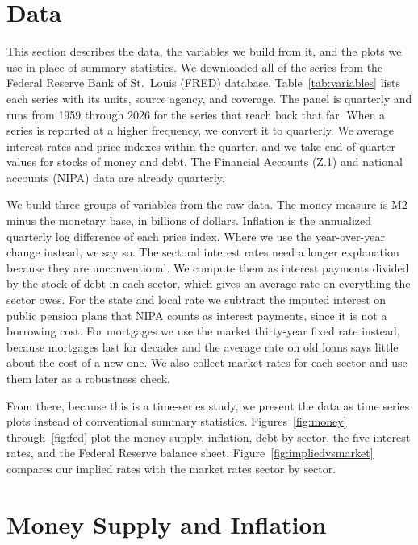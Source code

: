 \section{Data}
\label{sec:data}

This section describes the data, the variables we build from it, and the plots we use in place of summary statistics. We downloaded all of the series from the Federal Reserve Bank of St.\ Louis (FRED) database. Table~\ref{tab:variables} lists each series with its units, source agency, and coverage. The panel is quarterly and runs from 1959 through 2026 for the series that reach back that far. When a series is reported at a higher frequency, we convert it to quarterly. We average interest rates and price indexes within the quarter, and we take end-of-quarter values for stocks of money and debt. The Financial Accounts (Z.1) and national accounts (NIPA) data are already quarterly.

We build three groups of variables from the raw data. The money measure is M2 minus the monetary base, in billions of dollars. Inflation is the annualized quarterly log difference of each price index. Where we use the year-over-year change instead, we say so. The sectoral interest rates need a longer explanation because they are unconventional. We compute them as interest payments divided by the stock of debt in each sector, which gives an average rate on everything the sector owes. For the state and local rate we subtract the imputed interest on public pension plans that NIPA counts as interest payments, since it is not a borrowing cost. For mortgages we use the market thirty-year fixed rate instead, because mortgages last for decades and the average rate on old loans says little about the cost of a new one. We also collect market rates for each sector and use them later as a robustness check.

From there, because this is a time-series study, we present the data as time series plots instead of conventional summary statistics. Figures~\ref{fig:money} through~\ref{fig:fed} plot the money supply, inflation, debt by sector, the five interest rates, and the Federal Reserve balance sheet. Figure~\ref{fig:impliedvsmarket} compares our implied rates with the market rates sector by sector.

\section{Money Supply and Inflation}
\label{sec:money_inflation}

